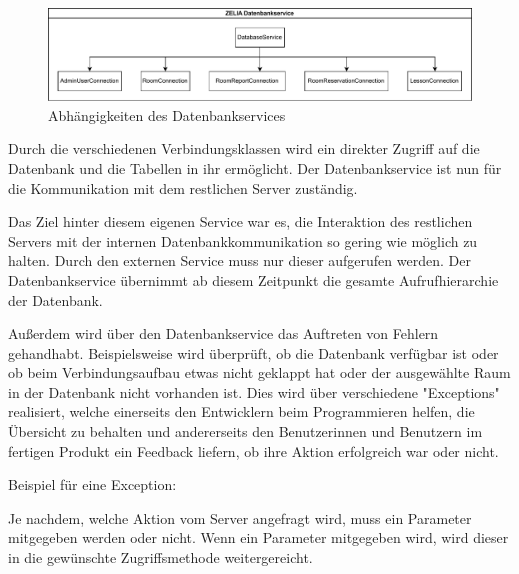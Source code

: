
\begin{figure}[H]
    \centering
    \includegraphics[width=\textwidth]{media/Sequelize/DatabaseService.svg.pdf}
    \caption{Abhängigkeiten des Datenbankservices}
\end{figure}

Durch die verschiedenen Verbindungsklassen wird ein direkter Zugriff auf die Datenbank und die Tabellen in ihr ermöglicht. Der Datenbankservice ist nun für die Kommunikation mit dem restlichen Server zuständig. 

Das Ziel hinter diesem eigenen Service war es, die Interaktion des restlichen Servers mit der internen Datenbankkommunikation so gering wie möglich zu halten. Durch den externen Service muss nur dieser aufgerufen werden. Der Datenbankservice übernimmt ab diesem Zeitpunkt die gesamte Aufrufhierarchie der Datenbank.

Außerdem wird über den Datenbankservice das Auftreten von Fehlern gehandhabt. Beispielsweise wird überprüft, ob die Datenbank verfügbar ist oder ob beim Verbindungsaufbau etwas nicht geklappt hat oder der ausgewählte Raum in der Datenbank nicht vorhanden ist. Dies wird über verschiedene "Exceptions" realisiert, welche einerseits den Entwicklern beim Programmieren helfen, die Übersicht zu behalten und andererseits den Benutzerinnen und Benutzern im fertigen Produkt ein Feedback liefern, ob ihre Aktion erfolgreich war oder nicht.

Beispiel für eine Exception:


Je nachdem, welche Aktion vom Server angefragt wird, muss ein Parameter mitgegeben werden oder nicht. Wenn ein Parameter mitgegeben wird, wird dieser in die gewünschte Zugriffsmethode weitergereicht.

